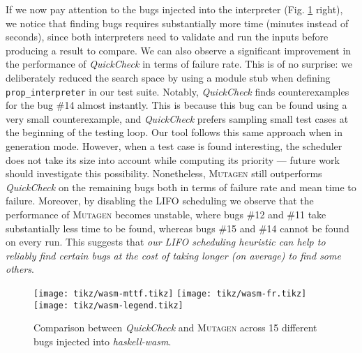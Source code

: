 \documentclass[sigconf,review,anonymous]{acmart}
\newcommand{\quickcheck}{\textit{QuickCheck}\xspace}
\newcommand{\mutagen}{\textsc{Mutagen}\xspace}
\begin{document}
If we now pay attention to the bugs injected into the interpreter (Fig.
\ref{fig:results:wasm} right), we notice that finding bugs requires
substantially more time (minutes instead of seconds), since both interpreters
need to validate and run the inputs before producing a result to compare.
%
We can also observe a significant improvement in the performance of \quickcheck
in terms of failure rate.
%
This is of no surprise: we deliberately reduced the search space by using a
module stub when defining \texttt{prop\_interpreter} in our test suite.
%
Notably, \quickcheck finds counterexamples for the bug \#14 almost instantly.
%
This is because this bug can be found using a very small counterexample, and
\quickcheck prefers sampling small test cases at the beginning of the testing
loop.
%
Our tool follows this same approach when in generation mode.
%
However, when a test case is found interesting, the scheduler does not take its
size into account while computing its priority --- future work should
investigate this possibility.
%
Nonetheless, \mutagen still outperforms \quickcheck on the remaining bugs both
in terms of failure rate and mean time to failure.
%
Moreover, by disabling the LIFO scheduling we observe that the performance of
\mutagen becomes unstable, where bugs \#12 and \#11 take substantially less time
to be found, whereas bugs \#15 and \#14 cannot be found on every run. 
%
This suggests that \emph{our LIFO scheduling heuristic can help to reliably find
certain bugs at the cost of taking longer (on average) to find some others}.

%

\begin{figure}[t]
  \centering
  \texttt{[image: tikz/wasm-mttf.tikz]}
  \texttt{[image: tikz/wasm-fr.tikz]}\vspace{-5pt}
  \texttt{[image: tikz/wasm-legend.tikz]}
  \vspace{-20pt}
  \caption{\label{fig:results:wasm} Comparison between \quickcheck and \mutagen
    across 15 different bugs injected into \textit{haskell-wasm}. }
\end{figure}
\end{document}
